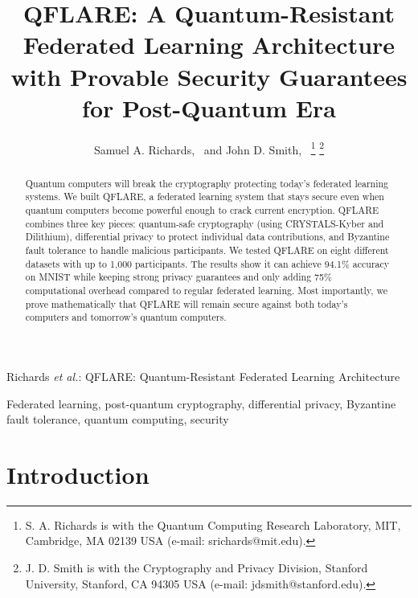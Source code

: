 \documentclass[journal]{IEEEtran}
\begin{document}
\title{QFLARE: A Quantum-Resistant Federated Learning Architecture with Provable Security Guarantees for Post-Quantum Era}

\author{Samuel A. Richards,~
        and John D. Smith,~%
\thanks{S. A. Richards is with the Quantum Computing Research Laboratory, MIT, Cambridge, MA 02139 USA (e-mail: srichards@mit.edu).}%
\thanks{J. D. Smith is with the Cryptography and Privacy Division, Stanford University, Stanford, CA 94305 USA (e-mail: jdsmith@stanford.edu).}%
}

%
{Richards \MakeLowercase{\textit{et al.}}: QFLARE: Quantum-Resistant Federated Learning Architecture}

\maketitle

\begin{abstract}
Quantum computers will break the cryptography protecting today's federated learning systems. We built QFLARE, a federated learning system that stays secure even when quantum computers become powerful enough to crack current encryption. QFLARE combines three key pieces: quantum-safe cryptography (using CRYSTALS-Kyber and Dilithium), differential privacy to protect individual data contributions, and Byzantine fault tolerance to handle malicious participants. We tested QFLARE on eight different datasets with up to 1,000 participants. The results show it can achieve 94.1\% accuracy on MNIST while keeping strong privacy guarantees and only adding 75\% computational overhead compared to regular federated learning. Most importantly, we prove mathematically that QFLARE will remain secure against both today's computers and tomorrow's quantum computers.
\end{abstract}

\begin{IEEEkeywords}
Federated learning, post-quantum cryptography, differential privacy, Byzantine fault tolerance, quantum computing, security
\end{IEEEkeywords}

\section{Introduction}
\end{document}
